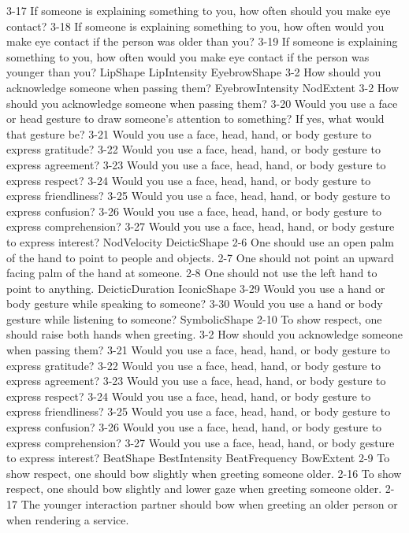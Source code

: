 	3-17 If someone is explaining something to  you,  how often should you make eye contact?
	3-18 If someone is explaining something to  you,  how often would you make eye contact if the person was older than you?
	3-19 If someone is explaining something to you,  how often would you make eye contact if the person was younger than you?
LipShape
LipIntensity
EyebrowShape
 	3-2 How should you acknowledge someone when passing them?
EyebrowIntensity
NodExtent
 	3-2 How should you acknowledge someone when passing them?
	3-20 Would you use a face or head gesture to draw someone's attention  to something? If yes, what would that gesture be? 
	3-21 Would you use a face, head, hand, or body gesture to express gratitude?
	3-22 Would you use a face,  head, hand, or body gesture to express agreement?
	3-23 Would you use a face,  head, hand, or body gesture to express  respect?
	3-24 Would you use a face,  head, hand, or body gesture to express friendliness?
	3-25 Would you use a face,  head, hand, or body gesture to express  confusion?
	3-26 Would you use a face,  head, hand, or body gesture to express comprehension? 
	3-27 Would you use a face,  head, hand, or body gesture to express interest?
NodVelocity
DeicticShape
	2-6 One should use an open palm of the hand to point to people and objects.
	2-7 One should not point an upward facing palm of the hand at someone.
	2-8 One should not use the left hand to point to anything. 
DeicticDuration
IconicShape
	3-29 Would you use a hand or body gesture while speaking to someone? 
	3-30 Would you use a hand or body gesture while listening to someone?
SymbolicShape
	2-10 To show respect, one should raise both hands when greeting.
	3-2 How should you acknowledge someone when passing them?
	3-21 Would you use a face, head, hand, or body gesture to express gratitude?
	3-22 Would you use a face,  head, hand, or body gesture to express agreement?
	3-23 Would you use a face,  head, hand, or body gesture to express  respect?
	3-24 Would you use a face,  head, hand, or body gesture to express friendliness?
	3-25 Would you use a face,  head, hand, or body gesture to express  confusion?
	3-26 Would you use a face,  head, hand, or body gesture to express comprehension? 
	3-27 Would you use a face,  head, hand, or body gesture to express interest?
BeatShape
BestIntensity
BeatFrequency
BowExtent
	2-9 To show respect, one should bow slightly when greeting someone older.
	2-16 To show respect, one should bow slightly and lower gaze when greeting someone older.
	2-17 The younger interaction partner should bow when greeting an older person or when rendering a service.
